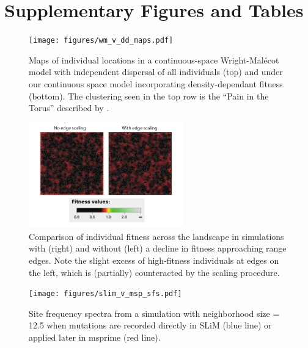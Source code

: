 \documentclass[10pt,twoside,lineno,hidelinks]{preprint}
\begin{document}
\clearpage 

\setcounter{table}{0}
\renewcommand{\thetable}{S\arabic{table}}%
\setcounter{figure}{0}
\renewcommand{\thefigure}{S\arabic{figure}}%

\section{Supplementary Figures and Tables}

\begin{figure}[p]
\centering
\texttt{[image: figures/wm\_v\_dd\_maps.pdf]}
\caption{Maps of individual locations in a continuous-space Wright-Malécot model with independent dispersal of all individuals (top) and under our continuous space model incorporating density-dependant fitness (bottom). The clustering seen in the top row is the ``Pain in the Torus'' described by \citet{Felsenstein1975}.}
\label{fig:wm_v_dd} 
\end{figure}
\FloatBarrier


\begin{figure}[p]
\centering
\includegraphics[width=0.6\textwidth]{figures/edge_scaling_comp.pdf}
\caption{Comparison of individual fitness across the landscape in simulations with (right) and without (left) a decline in fitness approaching range edges. Note the slight excess of high-fitness individuals at edges on the left, which is (partially) counteracted by the scaling procedure.}
\label{fig:edge_scaling} 
\end{figure}
\FloatBarrier


\begin{figure}[p]
\centering
\texttt{[image: figures/slim\_v\_msp\_sfs.pdf]}
\caption{Site frequency spectra from a simulation with neighborhood size = 12.5 when mutations are recorded directly in SLiM (blue line) or applied later in msprime (red line).}
\label{fig:slim_v_msp_sfs} 
\end{figure}
\FloatBarrier
\end{document}
